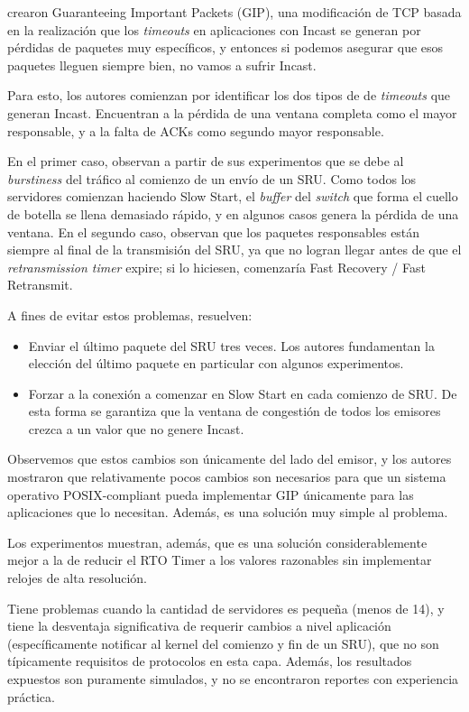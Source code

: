 \documentclass[runningheads,a4paper]{llncs}
\begin{document}
\citet{Zhang_GIP_2013} crearon Guaranteeing Important Packets (GIP), una modificación de TCP basada en la realización que los \textit{timeouts} en aplicaciones con Incast se generan por pérdidas de paquetes muy específicos, y entonces si podemos asegurar que esos paquetes lleguen siempre bien, no vamos a sufrir Incast.

Para esto, los autores comienzan por identificar los dos tipos de de \textit{timeouts} que generan Incast. Encuentran a la pérdida de una ventana completa como el mayor responsable, y a la falta de ACKs como segundo mayor responsable. 

En el primer caso, observan a partir de sus experimentos que se debe al \textit{burstiness} del tráfico al comienzo de un envío de un SRU. Como todos los servidores comienzan haciendo Slow Start, el \textit{buffer} del \textit{switch} que forma el cuello de botella se llena demasiado rápido, y en algunos casos genera la pérdida de una ventana. En el segundo caso, observan que los paquetes responsables están siempre al final de la transmisión del SRU, ya que no logran llegar antes de que el \textit{retransmission timer} expire; si lo hiciesen, comenzaría Fast Recovery / Fast Retransmit.

A fines de evitar estos problemas, resuelven:

\begin{itemize}
    \item Enviar el último paquete del SRU tres veces. Los autores fundamentan la elección del último paquete en particular con algunos experimentos.
    
    \item Forzar a la conexión a comenzar en Slow Start en cada comienzo de SRU. De esta forma se garantiza que la ventana de congestión de todos los emisores crezca a un valor que no genere Incast.
\end{itemize}

Observemos que estos cambios son únicamente del lado del emisor, y los autores mostraron que relativamente pocos cambios son necesarios para que un sistema operativo POSIX-compliant pueda implementar GIP únicamente para las aplicaciones que lo necesitan. Además, es una solución muy simple al problema.

Los experimentos muestran, además, que es una solución considerablemente mejor a la de reducir el RTO Timer a los valores razonables sin implementar relojes de alta resolución.

Tiene problemas cuando la cantidad de servidores es pequeña (menos de 14), y tiene la desventaja significativa de requerir cambios a nivel aplicación (específicamente notificar al kernel del comienzo y fin de un SRU), que no son típicamente requisitos de protocolos en esta capa. Además, los resultados expuestos son puramente simulados, y no se encontraron reportes con experiencia práctica.
\end{document}
